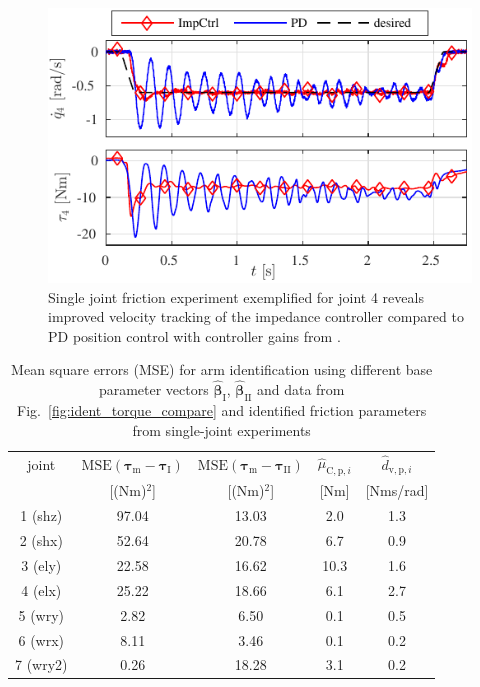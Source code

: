 %
\begin{figure}
\centering
\includegraphics[width=\linewidth]{./figures/Identification/SI_E036_Joint4_ConstVel_Summary_medium_speed}
\caption{Single joint friction experiment exemplified for joint 4 reveals improved velocity tracking of the impedance controller compared to PD position control with controller gains from \cite{2014:JFR-ViGIR-DRC-Trials, ConnerKohRomStu2015}.}
\label{fig:velocity_tracking_friction}
\SkipBeforeText
\end{figure}

%
\setlength\tabcolsep{5pt}
\begin{table}
   \caption{Mean square errors (MSE) for arm identification using different base parameter vectors $\hat{\bm{\beta}}_{\mathrm{I}}$, $\hat{\bm{\beta}}_{\mathrm{II}}$ and data from Fig.~\ref{fig:ident_torque_compare} and identified friction parameters from single-joint experiments}
  \begin{center}
   \begin{tabular}{c|c|c|c|c}
joint  & $\mathrm{MSE}(\bm{\tau}_{\mathrm{m}}-\bm{\tau}_{\mathrm{I}})$   & $\mathrm{MSE}(\bm{\tau}_{\mathrm{m}}-\bm{\tau}_{\mathrm{II}})$   & $\hat{{\mu}}_{\mathrm{C,p},i}$ & $\hat{{d}}_{\mathrm{v,p},i}$ \\
 & [(Nm)$^2$] & [(Nm)$^2$] & [Nm] & [Nms/rad] \\ 
\hline
1 (shz) &  97.04  & 13.03 & 2.0 & 1.3 \\
2 (shx) &  52.64  & 20.78 & 6.7 & 0.9 \\
3 (ely) &  22.58  & 16.62 & 10.3 & 1.6 \\
4 (elx) &  25.22  & 18.66 & 6.1 & 2.7 \\
\hline
5 (wry) &  2.82 & 6.50 & 0.1 & 0.5 \\
6 (wrx) &  8.11 & 3.46 & 0.1 & 0.2 \\
7 (wry2) &  0.26 & 18.28 & 3.1 & 0.2 \\
   \end{tabular}
  \end{center} 
\label{tab:errors_tracking_left}
\SkipBeforePicture
\end{table}
\setlength\tabcolsep{6pt}

